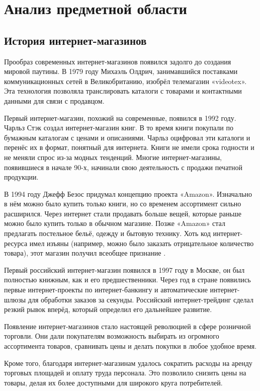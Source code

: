 \section{Анализ предметной области}
\subsection{История интернет-магазинов}
Прообраз современных интернет-магазинов появился задолго до создания мировой паутины. В 1979 году Михаэль Олдрич, занимавшийся поставками коммуникационных сетей в Великобританию, изобрёл телемагазин «videotex». Эта технология позволяла транслировать каталоги с товарами и контактными данными для связи с продавцом.

Первый интернет-магазин, похожий на современные, появился в 1992 году. Чарльз Стэк создал интернет-магазин книг. В то время книги покупали по бумажным каталогам с ценами и описаниями. Чарльз оцифровал эти каталоги и перенёс их в формат, понятный для интернета. Книги не имели срока годности и не меняли спрос из-за модных тенденций. Многие интернет-магазины, появившиеся в начале 90-х, начинали свою деятельность с продажи печатной продукции.

В 1994 году Джефф Безос придумал концепцию проекта «Amazon». Изначально в нём можно было купить только книги, но со временем ассортимент сильно расширился. Через интернет стали продавать больше вещей, которые раньше можно было купить только в обычном магазине. Позже «Amazon» стал предлагать постельное бельё, одежду и бытовую технику. Хоть код интернет-ресурса имел изъяны (например, можно было заказать отрицательное количество товара), этот магазин получил всеобщее признание \cite{stoun}.

Первый российский интернет-магазин появился в 1997 году в Москве, он был полностью книжным, как и его предшественники. Через год в стране появились первые интернет-проекты по интернет-банкингу и автоматические интернет-шлюзы для обработки заказов за секунды. Российский интернет-трейдинг сделал резкий рывок вперёд, который определил его дальнейшее развитие.

Появление интернет-магазинов стало настоящей революцией в сфере розничной торговли. Они дали покупателям возможность выбирать из огромного ассортимента товаров, сравнивать цены и делать покупки в любое удобное время.

Кроме того, благодаря интернет-магазинам удалось сократить расходы на аренду торговых площадей и оплату труда персонала. Это позволило снизить цены на товары, делая их более доступными для широкого круга потребителей.

